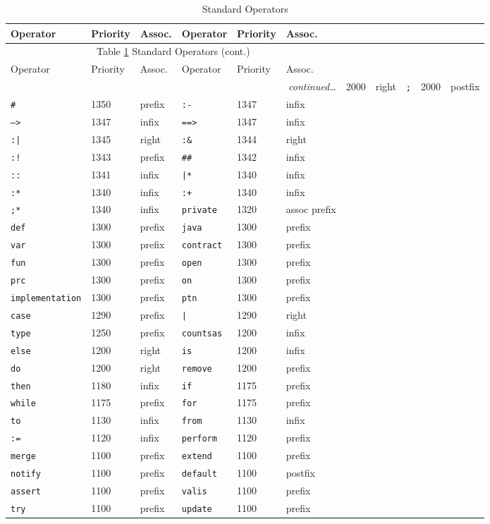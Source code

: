 \begin{longtable}{|lll|lll|}
\caption{Standard Operators}\label{StandardOps}\\ 
\hline
Operator&Priority&Assoc.&Operator&Priority&Assoc.\\
\hline
\endfirsthead
\multicolumn{6}{c}{
{Table \ref{StandardOps} Standard Operators (cont.)}}\\
\hline
Operator&Priority&Assoc.&Operator&Priority&Assoc.\\
\hline
\endhead
\hline\multicolumn{6}{r}{\small\emph{continued\ldots}}\
\endfoot
\hline
\endlastfoot
\tt ;&2000&right&\tt ;&2000&postfix\\
\tt \#&1350&prefix&\tt :-&1347&infix\\
\tt -->&1347&infix&\tt ==>&1347&infix\\
\tt :|&1345&right&\tt :\&&1344&right\\
\tt :!&1343&prefix&\tt \#\#&1342&infix\\
\tt ::&1341&infix&\tt |*&1340&infix\\
\tt :*&1340&infix&\tt :+&1340&infix\\
\tt ;*&1340&infix&\tt private&1320&assoc prefix\\
\tt def&1300&prefix&\tt java&1300&prefix\\
\tt var&1300&prefix&\tt contract&1300&prefix\\
\tt fun&1300&prefix&\tt open&1300&prefix\\
\tt prc&1300&prefix&\tt on&1300&prefix\\
\tt implementation&1300&prefix&\tt ptn&1300&prefix\\
\tt case&1290&prefix&\tt |&1290&right\\
\tt type&1250&prefix&\tt counts\spce{}as&1200&infix\\
\tt else&1200&right&\tt is&1200&infix\\
\tt do&1200&right&\tt remove&1200&prefix\\
\tt then&1180&infix&\tt if&1175&prefix\\
\tt while&1175&prefix&\tt for&1175&prefix\\
\tt to&1130&infix&\tt from&1130&infix\\
\tt :=&1120&infix&\tt perform&1120&prefix\\
\tt merge&1100&prefix&\tt extend&1100&prefix\\
\tt notify&1100&prefix&\tt default&1100&postfix\\
\tt assert&1100&prefix&\tt valis&1100&prefix\\
\tt try&1100&prefix&\tt update&1100&prefix\\

\end{longtable}
